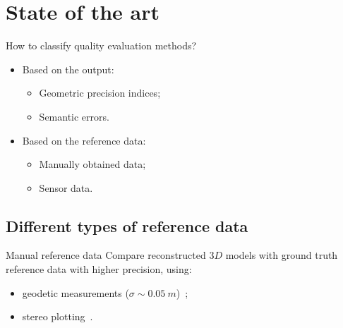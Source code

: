 \documentclass{beamer}
\begin{document}
    \section{State of the art}
        \begin{frame}{How to classify quality evaluation methods?}
            \begin{itemize}[label=$\blacktriangleright$, font=\color{IGNGreen}]
                \item Based on the output:
                \begin{itemize}[label=--]
                    \item Geometric precision indices;
                    \item Semantic errors.
                \end{itemize}
                \item Based on the reference data:
                \begin{itemize}[label=--]
                    \item Manually obtained data;
                    \item Sensor data.
                \end{itemize}
            \end{itemize}
        \end{frame}
        \subsection{Different types of reference data}
            \begin{frame}{Manual reference data}
                Compare reconstructed $3D$ models with ground truth reference data with higher precision, using:
                \begin{itemize}[label=$\blacktriangleright$, font=\color{IGNGreen}]
                    \item<1-> geodetic measurements ($ \sigma \sim \SI{0.05}{m}$)~\cite{Kaartinen2005, Voegtle2003};
                    \item<2-> stereo plotting~\cite{Kaartinen2005, Zeng2014}.
                \end{itemize}
            \end{frame}
\end{document}
